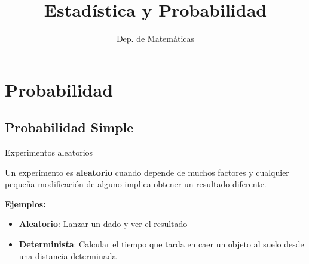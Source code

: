 \documentclass[11pt,handout]{beamer}
\title{Estadística y Probabilidad}
\date{}
\author{Dep. de Matemáticas}
\begin{document}


\AtBeginSubsection[]{
    \begin{frame}
        \tableofcontents[currentsubsection]
    \end{frame}
}


\begin{frame}
\titlepage
\end{frame}


\section{Probabilidad}
\subsection{Probabilidad Simple}

\begin{frame}{Experimentos aleatorios}
\begin{block}{}
Un experimento es \textbf{aleatorio} cuando depende de muchos factores y cualquier pequeña modificación de alguno implica obtener un resultado diferente.
\end{block}
\pause
\textbf{Ejemplos:}
\begin{itemize}[<+->]
 \item \textbf{Aleatorio}: Lanzar un dado y ver el resultado
 \item \textbf{Determinista}: Calcular el tiempo que tarda en caer un objeto al suelo desde una distancia determinada
 \end{itemize} 

\end{frame}
\end{document}
